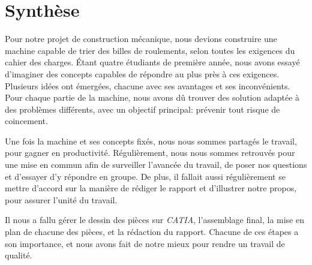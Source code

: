 \chapter{Synthèse}
Pour notre projet de construction mécanique, nous devions construire une machine capable de trier des billes de roulements, selon toutes les exigences du cahier des charges. Étant quatre étudiants de première année, nous avons essayé d'imaginer des concepts capables de répondre au plus près à ces exigences. Plusieurs idées ont émergées, chacune avec ses avantages et ses inconvénients. Pour chaque partie de la machine, nous avons dû trouver des solution adaptée à des problèmes différents, avec un objectif principal: prévenir tout risque de coincement.

Une fois la machine et ses concepts fixés, nous nous sommes partagés le travail, pour gagner en productivité. Régulièrement, nous nous sommes retrouvés pour une mise en commun afin de surveiller l'avancée du travail, de poser nos questions et d'essayer d'y répondre en groupe. De plus, il fallait aussi régulièrement se mettre d'accord sur la manière de rédiger le rapport et d'illustrer notre propos, pour assurer l'unité du travail. 

Il nous a fallu gérer le dessin des pièces sur \emph{CATIA}, l'assemblage final, la mise en plan de chacune des pièces, et la rédaction du rapport. Chacune de ces étapes a son importance, et nous avons fait de notre mieux pour rendre un travail de qualité.